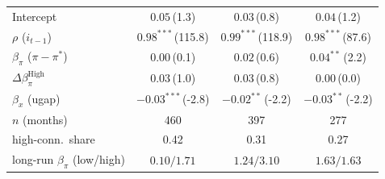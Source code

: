 \begin{tabular}{lccc}
Intercept & $0.05$\,{\scriptsize(1.3)} & $0.03$\,{\scriptsize(0.8)} & $0.04$\,{\scriptsize(1.2)} \\
$\rho$ ($i_{t-1}$) & $0.98^{***}$\,{\scriptsize(115.8)} & $0.99^{***}$\,{\scriptsize(118.9)} & $0.98^{***}$\,{\scriptsize(87.6)} \\
$\beta_\pi$ ($\pi-\pi^*$) & $0.00$\,{\scriptsize(0.1)} & $0.02$\,{\scriptsize(0.6)} & $0.04^{**}$\,{\scriptsize(2.2)} \\
$\Delta\beta_\pi^{\text{High}}$ & $0.03$\,{\scriptsize(1.0)} & $0.03$\,{\scriptsize(0.8)} & $0.00$\,{\scriptsize(0.0)} \\
$\beta_x$ (ugap) & $-0.03^{***}$\,{\scriptsize(-2.8)} & $-0.02^{**}$\,{\scriptsize(-2.2)} & $-0.03^{**}$\,{\scriptsize(-2.2)} \\
\addlinespace
$n$ (months) & 460 & 397 & 277 \\
high-conn.\ share & 0.42 & 0.31 & 0.27 \\
long-run $\beta_\pi$ (low/high) & $0.10/1.71$ & $1.24/3.10$ & $1.63/1.63$ \\
\bottomrule
\end{tabular}
